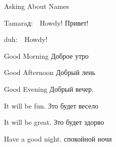 \documentclass[avery5371,grid,frame]{flashcards}
\newcommand{\inR}[1]{\foreignlanguage{russian}{#1}}
\newcommand{\speakR}[1]{\item \foreignlanguage{russian}{#1}:\ \ }
\newcommand{\speakE}[1]{\item \foreignlanguage{english}{#1}:\ \ }
\newcommand{\aDlog}[1]{
  \begin{list}{\quad}{}
#1
  \end{list}}
\begin{document}

\begin{flashcard}[]{Asking About Names}
  \smallskip
\aDlog{
    \speakR{\inR{Tamaraд}}Howdy! \inR{Привет!}
    \speakE{\inR{duh}}Howdy!
}
\end{flashcard}


\begin{flashcard}[Greetings]{Good Morning}
  \smallskip
\inR{Доброе утро}
\end{flashcard}

\begin{flashcard}[Greetings]{Good Afternoon}
  \smallskip
\inR{Добрый лень}
\end{flashcard}

\begin{flashcard}[Greetings]{Good Evening}
  \smallskip
\inR{Добрый вечер.}
\end{flashcard}



\begin{flashcard}[Greetings]{It will be fun.}
  \smallskip
\inR{Зто будет весело}
\end{flashcard}



\begin{flashcard}[Greetings]{It will be great.}
  \smallskip
\inR{Зто будет здорво}
\end{flashcard}


\begin{flashcard}[Greetings]{Have a good night.}
  \smallskip
\inR{спокойной ночи}
\end{flashcard}
\end{document}
